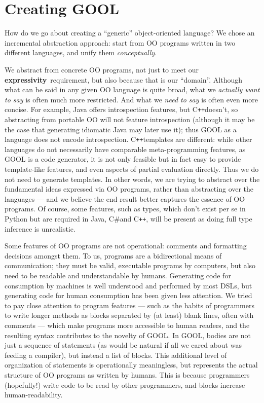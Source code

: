 \documentclass[sigplan,review,prologue,dvipsnames]{acmart}
\newcommand{\Csharp}{C\#}
\newcommand{\Cplusplus}{C\texttt{++}}
\newcommand{\abbrev}[1]{\textbf{#1}}
\newcommand{\expressivity}{\abbrev{expressivity}}
\begin{document}
\section{Creating GOOL} \label{sec:creating}

How do we go about creating a ``generic'' object-oriented language?
We chose an incremental abstraction approach: start from OO programs written in 
two different languages, and unify them \emph{conceptually}.

We abstract from concrete OO programs, not just to meet our
\expressivity~requirement, but also because that is our ``domain''.  Although
what can be said in any given OO language is quite broad, what we
\emph{actually want to say} is often much more restricted. And what we
\emph{need to say} is often even more concise.
For example, Java offers introspection features, but \Cplusplus doesn't, so
abstracting from portable OO will not feature introspection (although it
may be the case that generating idiomatic Java may later use it);
thus GOOL as a language does not encode introspection.  \Cplusplus templates
are different: while other languages do not necessarily have comparable
meta-programming features, as GOOL is a code generator, it is not only
feasible but in fact easy to provide template-like features, and even aspects of
partial evaluation directly. Thus we do not need to generate templates.
In other words, we are trying to abstract over the fundamental ideas
expressed via OO programs, rather than abstracting over the languages ---
and we believe the end result better captures the essence of OO programs.
Of course, some features, such as types, which don't exist per se in 
Python but are required in Java, \Csharp and \Cplusplus, will be present
as doing full type inference is unrealistic.

Some features of OO programs are not operational: comments and formatting
decisions amongst them.  To us, programs are a bidirectional means of
communication; they must be valid, executable programs by computers, but
also need to be readable and understandable by humans.
Generating code for consumption by machines is well understood and performed by 
most DSLs, but generating code for human consumption has been given less 
attention. We tried to pay close attention to program features --- such
as the habits of programmers to write longer methods as blocks separated
by (at least) blank lines, often with comments --- which make programs
more accessible to human readers, and the resulting syntax contributes to the 
novelty of GOOL. In GOOL, bodies are not just a sequence of statements (as 
would be natural if all we cared about was feeding a compiler), but instead a 
list of blocks. This additional level of organization of statements is 
operationally meaningless, but represents the actual structure of OO programs 
as written by humans.  This is because programmers (hopefully!) write code to 
be read by other programmers, and blocks increase human-readability.
\end{document}
